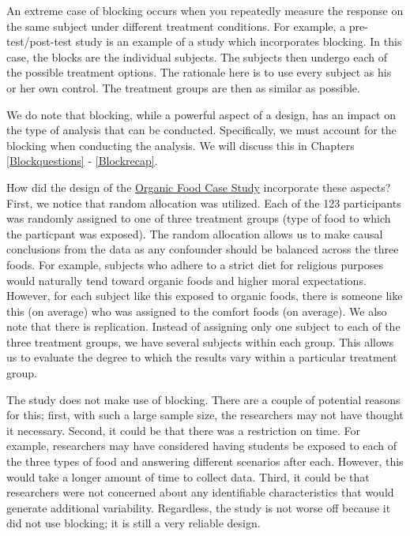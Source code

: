 \documentclass[
]{book}
\theoremstyle{plain}
\theoremstyle{mydefn}
\theoremstyle{myexmpl}
\theoremstyle{remark}
\begin{document}
An extreme case of blocking occurs when you repeatedly measure the response on the same subject under different treatment conditions. For example, a pre-test/post-test study is an example of a study which incorporates blocking. In this case, the blocks are the individual subjects. The subjects then undergo each of the possible treatment options. The rationale here is to use every subject as his or her own control. The treatment groups are then as similar as possible.

We do note that blocking, while a powerful aspect of a design, has an impact on the type of analysis that can be conducted. Specifically, we must account for the blocking when conducting the analysis. We will discuss this in Chapters \ref{Blockquestions} - \ref{Blockrecap}.

How did the design of the \protect\hyperlink{CaseOrganic}{Organic Food Case Study} incorporate these aspects? First, we notice that random allocation was utilized. Each of the 123 participants was randomly assigned to one of three treatment groups (type of food to which the particpant was exposed). The random allocation allows us to make causal conclusions from the data as any confounder should be balanced across the three foods. For example, subjects who adhere to a strict diet for religious purposes would naturally tend toward organic foods and higher moral expectations. However, for each subject like this exposed to organic foods, there is someone like this (on average) who was assigned to the comfort foods (on average). We also note that there is replication. Instead of assigning only one subject to each of the three treatment groups, we have several subjects within each group. This allows us to evaluate the degree to which the results vary within a particular treatment group.

The study does not make use of blocking. There are a couple of potential reasons for this; first, with such a large sample size, the researchers may not have thought it necessary. Second, it could be that there was a restriction on time. For example, researchers may have considered having students be exposed to each of the three types of food and answering different scenarios after each. However, this would take a longer amount of time to collect data. Third, it could be that researchers were not concerned about any identifiable characteristics that would generate additional variability. Regardless, the study is not worse off because it did not use blocking; it is still a very reliable design.
\end{document}
